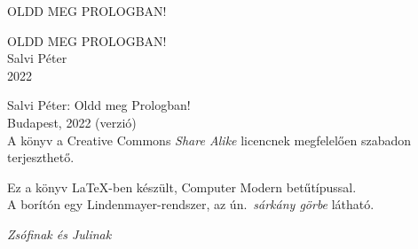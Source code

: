 \documentclass[a5paper]{book}
\theoremstyle{definition}
\begin{document}
\frontmatter
{}



\thispagestyle{empty}
\newpage

\begin{titlepage}
\thispagestyle{empty}
\centering
\vspace*{2cm}
{\large OLDD MEG PROLOGBAN!}
\end{titlepage}

\thispagestyle{empty}
\newpage

\begin{titlepage}
\centering
\vspace*{2cm}
{\Large OLDD MEG PROLOGBAN!}\\
\vspace{8cm}
{\large Salvi Péter}\\
\vspace{1em}
2022
\end{titlepage}

\thispagestyle{empty}
\begin{center}
  \small
  Salvi Péter: Oldd meg Prologban!\\
  Budapest, 2022 (verzió)\\
  \bigskip
  A könyv a Creative Commons \emph{Share Alike} licencnek megfelelően
  szabadon terjeszthető.
\end{center}
\vspace*{\fill}
{\footnotesize Ez a könyv \LaTeX-ben készült, Computer Modern betűtípussal.\\
  A borítón egy Lindenmayer-rendszer, az ún.~\emph{sárkány görbe} látható.
}

\clearpage
\thispagestyle{empty}
\begin{center}
  \vspace*{\fill}
  {\Large\emph{Zsófinak és Julinak}}
  \vspace*{\fill}
\end{center}
\clearpage

\thispagestyle{empty}
\newpage

\addtocounter{page}{2}

\tableofcontents



\mainmatter
{}









\backmatter





\printindex
\end{document}
